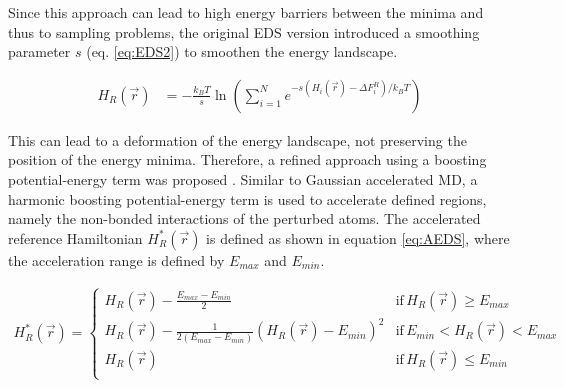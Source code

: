 Since this approach can lead to high energy barriers between the minima and thus to sampling problems, the original EDS version introduced a smoothing parameter $s$ (eq. \ref{eq:EDS2}) to smoothen the energy landscape. 

\begin{equation}
\begin{aligned}
H_R(\vec{r}) & = -\frac{k_BT}{s} \ln  \left( \sum_{i=1}^{N} e^{ -s(H_i(\vec{r}) - \Delta F_{i}^R)/k_BT} \right) 
\end{aligned}
\label{eq:EDS2}
\end{equation}

This can lead to a deformation of the energy landscape, not preserving the position of the energy minima. Therefore, a refined approach using a boosting potential-energy term was proposed \cite{JP2018,JP2020}. Similar to Gaussian accelerated MD, a harmonic boosting potential-energy term is used to accelerate defined regions, namely the non-bonded interactions of the perturbed atoms. The accelerated reference Hamiltonian $H_R^{\ast}(\vec{r})$ is defined as shown in equation \ref{eq:AEDS}, where the acceleration range is defined by $E_{max}$ and $E_{min}$. 

\begin{equation}
  \begin{aligned}
H_R^{\ast}(\vec{r}) =\begin{cases}
        H_R(\vec{r}) - \frac{E_{max} - E_{min}}{2} &\text{if} \, H_R(\vec{r}) \geq E_{max} \\

        H_R(\vec{r}) - \frac{1}{2(E_{max} - E_{min})}(H_R(\vec{r}) -  E_{min})^2 &\text{if} \,  E_{min} < H_R(\vec{r}) < E_{max} \\

        H_R(\vec{r}) &\text{if} \, H_R(\vec{r}) \leq E_{min} \\
     \end{cases}
  \end{aligned}
  \label{eq:AEDS}
\end{equation}

